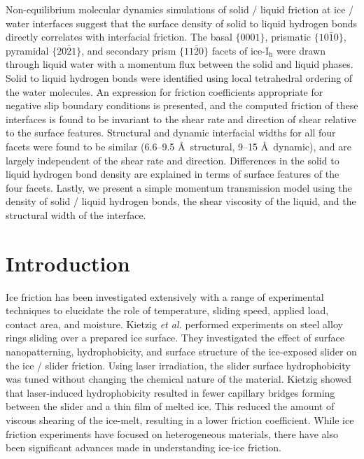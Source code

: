 Non-equilibrium molecular dynamics simulations of solid / liquid
friction at ice / water interfaces suggest that the surface density
of solid to liquid hydrogen bonds directly correlates with
interfacial friction.  The basal $\{0001\}$, prismatic
$\{10\bar{1}0\}$, pyramidal $\{20\bar{2}1\}$, and secondary prism
$\{11\bar{2}0\}$ facets of ice-I$_\mathrm{h}$ were drawn through
liquid water with a momentum flux between the solid and liquid
phases. Solid to liquid hydrogen bonds were identified using local
tetrahedral ordering of the water molecules. An expression for
friction coefficients appropriate for negative slip boundary
conditions is presented, and the computed friction of these
interfaces is found to be invariant to the shear rate and direction
of shear relative to the surface features. Structural and dynamic
interfacial widths for all four facets were found to be similar
(6.6--9.5 \AA~structural, 9--15 \AA~dynamic), and are largely
independent of the shear rate and direction. Differences in the
solid to liquid hydrogen bond density are explained in terms of
surface features of the four facets. Lastly, we present a simple
momentum transmission model using the density of solid / liquid
hydrogen bonds, the shear viscosity of the liquid, and the
structural width of the interface.


\section{Introduction}

Ice friction has been investigated extensively with a range
of experimental techniques to elucidate the role of
temperature,\cite{Bowden1939,Evans1976,Roberts1981,Derjaguin1988,Liang2003,Higgins2008} sliding speed,\cite{Evans1976,Derjaguin1988,Liang2003} applied
load,\cite{Bowden1939,Oksanen1982,Derjaguin1988,Buhl2001,Baurle2006}
contact area,\cite{Bowden1939,Baurle2007} and
moisture.\cite{Calabrese1980} Kietzig \textit{et al.} performed
experiments on steel alloy rings sliding over a prepared ice
surface.\cite{Kietzig2009} They investigated the effect of surface
nanopatterning, hydrophobicity, and surface structure of the
ice-exposed slider on the ice / slider friction.
Using laser irradiation, the slider surface hydrophobicity was tuned
without changing the chemical nature of the material. Kietzig showed
that laser-induced hydrophobicity resulted in fewer capillary bridges
forming between the slider and a thin film of melted ice. This reduced
the amount of viscous shearing of the ice-melt, resulting in a lower
friction coefficient.
While ice friction experiments have focused on heterogeneous
materials,\cite{Bowden1939,Evans1976,Derjaguin1988,Liang2003,Liang2005,Baurle2006,Baurle2007,Kietzig2009,Kietzig2010}
there have also been significant advances made in understanding
ice-ice
friction.\cite{Oksanen1982,Kennedy2000,Maeno2004,Fortt2007,Fortt2011,Lishman2011,Samadashvili2013}

